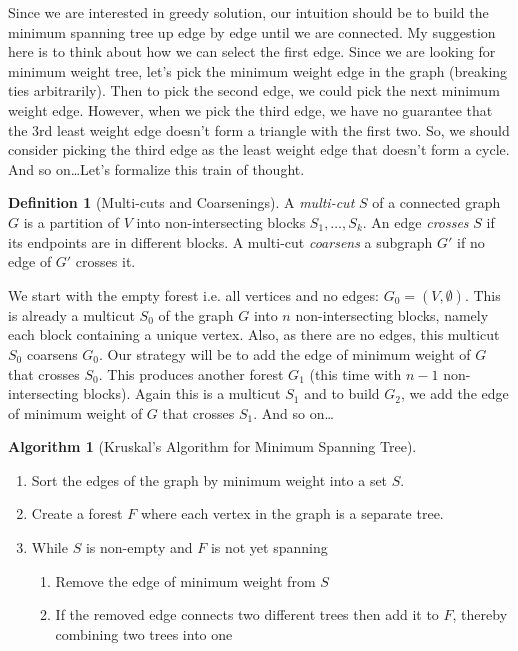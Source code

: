 \documentclass[10pt]{article}
\theoremstyle{plain}
\theoremstyle{definition}
\newtheorem{defn}[thm]{Definition} %
\newtheorem{alg}[thm]{Algorithm}
\numberwithin{equation}{section}
\numberwithin{figure}{section}
\begin{document}
\noindent Since we are interested in greedy solution, our intuition should be to build the minimum spanning tree up edge by edge until we are connected. My suggestion here is to think about how we can select the first edge. Since we are looking for minimum weight tree, let's pick the minimum weight edge in the graph (breaking ties arbitrarily). Then to pick the second edge, we could pick the next minimum weight edge. However, when we pick the third edge, we have no guarantee that the 3rd least weight edge doesn't form a triangle with the first two. So, we should consider picking the third edge as the least weight edge that doesn't form a cycle. And so on\ldots Let's formalize this train of thought.


\begin{defn}[Multi-cuts and Coarsenings]
A \emph{multi-cut} $S$ of a connected graph $G$ is a partition of $V$ into non-intersecting blocks $S_1, \ldots, S_k$. An edge \emph{crosses} $S$ if its endpoints are in different blocks. A multi-cut \emph{coarsens} a subgraph $G'$ if no edge of $G'$ crosses it. 
\end{defn}

\noindent We start with the empty forest i.e. all vertices and no edges: $G_0 = (V, \emptyset)$. This is already a multicut $S_0$ of the graph $G$ into $n$ non-intersecting blocks, namely each block containing a unique vertex. Also, as there are no edges, this multicut $S_0$ coarsens $G_0$. Our strategy will be to add the edge of minimum weight of $G$ that crosses $S_0$. This produces another forest $G_1$ (this time with $n-1$ non-intersecting blocks). Again this is a multicut $S_1$ and to build $G_2$, we add the edge of minimum weight of $G$ that crosses $S_1$. And so on\ldots 

\begin{alg}[Kruskal's Algorithm for Minimum Spanning Tree] \ \\
\begin{enumerate}
\item Sort the edges of the graph by minimum weight into a set $S$.
\item Create a forest $F$ where each vertex in the graph is a separate tree.
\item While $S$ is non-empty and $F$ is not yet spanning
\begin{enumerate}
\item Remove the edge of minimum weight from $S$
\item If the removed edge connects two different trees then add it to $F$, thereby combining two trees into one
\end{enumerate}
\end{enumerate} \label{kruskal-alg}
\end{alg}
\end{document}
